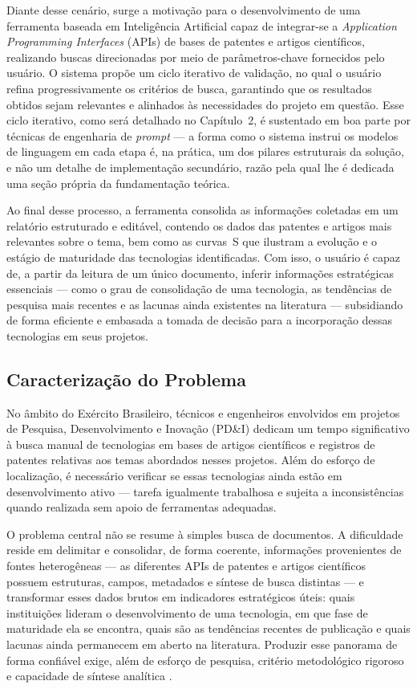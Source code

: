 \documentclass[12pt, a4paper]{article}
\begin{document}
  Diante desse cenário, surge a motivação para o desenvolvimento de uma
ferramenta baseada em Inteligência Artificial capaz de integrar-se a
\textit{Application Programming Interfaces} (APIs) de bases de patentes e
artigos científicos, realizando buscas direcionadas por meio de parâmetros-chave
fornecidos pelo usuário. O sistema propõe um ciclo iterativo de validação, no
qual o usuário refina progressivamente os critérios de busca, garantindo que os
resultados obtidos sejam relevantes e alinhados às necessidades do projeto em
questão. Esse ciclo iterativo, como será detalhado no Capítulo~2, é sustentado
em boa parte por técnicas de engenharia de \textit{prompt} --- a forma como o
sistema instrui os modelos de linguagem em cada etapa é, na prática, um dos
pilares estruturais da solução, e não um detalhe de implementação secundário,
razão pela qual lhe é dedicada uma seção própria da fundamentação teórica.

  Ao final desse processo, a ferramenta consolida as informações coletadas em um
relatório estruturado e editável, contendo os dados das patentes e artigos mais relevantes
sobre o tema, bem como as curvas~S que ilustram a evolução e o estágio de
maturidade das tecnologias identificadas. Com isso, o usuário é capaz de, a
partir da leitura de um único documento, inferir informações estratégicas
essenciais --- como o grau de consolidação de uma tecnologia, as tendências de
pesquisa mais recentes e as lacunas ainda existentes na literatura --- subsidiando
de forma eficiente e embasada a tomada de decisão para a incorporação dessas
tecnologias em seus projetos.

  \subsection{Caracterização do Problema}

  No âmbito do Exército Brasileiro, técnicos e engenheiros envolvidos em
projetos de Pesquisa, Desenvolvimento e Inovação (PD\&I) dedicam um tempo
significativo à busca manual de tecnologias em bases de artigos científicos e
registros de patentes relativas aos temas abordados nesses projetos. Além do
esforço de localização, é necessário verificar se essas tecnologias ainda estão
em desenvolvimento ativo --- tarefa igualmente trabalhosa e sujeita a
inconsistências quando realizada sem apoio de ferramentas adequadas.

  O problema central não se resume à simples busca de documentos. A dificuldade reside
em delimitar e consolidar, de forma coerente, informações provenientes de fontes
heterogêneas --- as diferentes APIs de patentes e artigos científicos possuem estruturas, campos,
metadados e síntese de busca distintas --- e transformar esses dados brutos em indicadores
estratégicos úteis: quais instituições lideram o desenvolvimento de uma
tecnologia, em que fase de maturidade ela se encontra, quais são as tendências
recentes de publicação e quais lacunas ainda permanecem em aberto na literatura.
Produzir esse panorama de forma confiável exige, além de esforço de pesquisa,
critério metodológico rigoroso e capacidade de síntese analítica \cite{porter2004}.
\end{document}

